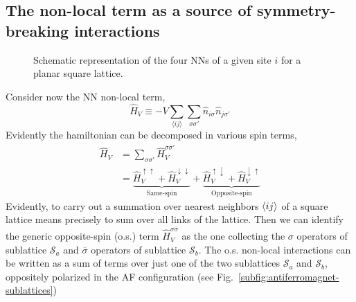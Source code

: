 \subsection{The non-local term as a source of symmetry-breaking interactions}

\begin{figure}
	\centering
	
	\caption{Schematic representation of the four NNs of a given site $i$ for a planar square lattice.}
	\label{fig:square-nearest-neighbors}
\end{figure}

Consider now the NN non-local term,
\begin{equation}\label{eq:extended-hubbard-nonlocal-interaction}
	\hat H_V \equiv - V \sum_{\langle ij \rangle} \sum_{\sigma \sigma'} \hat n_{i\sigma} \hat n_{j\sigma'}
\end{equation}
Evidently the hamiltonian can be decomposed in various spin terms,
\[
\begin{aligned}
	\hat H_V &= \sum_{\sigma \sigma'} \hat H_V^{\sigma\sigma'} \\
	&= \underbrace{
		\hat H_V^{\uparrow\uparrow} + \hat H_V^{\downarrow\downarrow}
	}_\text{Same-spin} + \underbrace{
		\hat H_V^{\uparrow\downarrow} + \hat H_V^{\downarrow\uparrow}
	}_\text{Opposite-spin}
\end{aligned}
\]
Evidently, to carry out a summation over nearest neighbors $\ev{ij}$ of a square lattice means precisely to sum over all links of the lattice. Then we can identify the generic opposite-spin (o.s.) term $\hat H_V^{\sigma \overline{\sigma}}$ as the one collecting the $\sigma$ operators of sublattice $\mathcal{S}_a$ and $\overline{\sigma}$ operators of sublattice $\mathcal{S}_b$. 
The o.s. non-local interactions can be written as a sum of terms over just one of the two sublattices $\mathcal{S}_a$ and $\mathcal{S}_b$, oppositely polarized in the AF configuration (see Fig.~\ref{subfig:antiferromagnet-sublattices})
